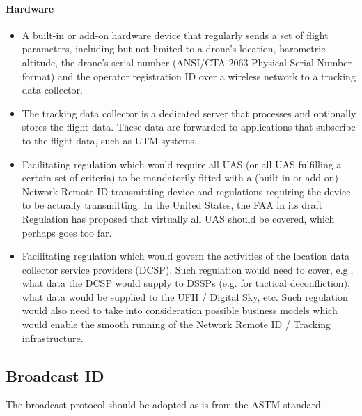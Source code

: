 \documentclass{ua_wgs_base}
\begin{document}
\paragraph{Hardware}
\begin{itemize}
\item A built-in or add-on hardware device that regularly sends a set of
flight parameters, including but not limited to a drone\textquoteright s
location, barometric altitude, the drone\textquoteright s serial number
(ANSI/CTA-2063 Physical Serial Number format) and the operator registration
ID over a wireless network to a tracking data collector.
\item The tracking data collector is a dedicated server that processes and
optionally stores the flight data. These data are forwarded to applications
that subscribe to the flight data, such as UTM systems.
\item Facilitating regulation which would require all UAS (or all UAS fulfilling
a certain set of criteria) to be mandatorily fitted with a (built-in
or add-on) Network Remote ID transmitting device and regulations requiring
the device to be actually transmitting. In the United States, the
FAA in its draft Regulation has proposed that virtually all UAS should
be covered, which perhaps goes too far.
\item Facilitating regulation which would govern the activities of the location
data collector service providers (DCSP). Such regulation would need
to cover, e.g., what data the DCSP would supply to DSSPs (e.g. for
tactical deconfliction), what data would be supplied to the UFII /
Digital Sky, etc. Such regulation would also need to take into consideration
possible business models which would enable the smooth running of
the Network Remote ID / Tracking infrastructure. 
\end{itemize}


\subsection{Broadcast ID}

The broadcast protocol should be adopted as-is from the ASTM standard.
\end{document}
